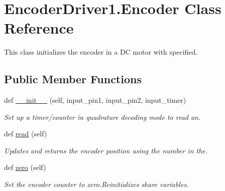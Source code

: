\hypertarget{classEncoderDriver1_1_1Encoder}{}\section{Encoder\+Driver1.\+Encoder Class Reference}
\label{classEncoderDriver1_1_1Encoder}


This class initializes the encoder in a DC motor with specified.  


\subsection*{Public Member Functions}
\begin{DoxyCompactItemize}
\item 
def \mbox{\hyperlink{classEncoderDriver1_1_1Encoder_aa7177f4e682b9507dfb0db1602137c7c}{\+\_\+\+\_\+init\+\_\+\+\_\+}} (self, input\+\_\+pin1, input\+\_\+pin2, input\+\_\+timer)
\begin{DoxyCompactList}\small\item\em Set up a timer/counter in quadrature decoding mode to read an. \end{DoxyCompactList}\item 
def \mbox{\hyperlink{classEncoderDriver1_1_1Encoder_a40717d85819b23fba3c758c1c3a6ae9d}{read}} (self)
\begin{DoxyCompactList}\small\item\em Updates and returns the encoder position using the number in the. \end{DoxyCompactList}\item 
def \mbox{\hyperlink{classEncoderDriver1_1_1Encoder_a9d715e18b6509019f5233b8f31af2c0c}{zero}} (self)
\begin{DoxyCompactList}\small\item\em Set the encoder counter to zero.\+Reinitializes share variables. \end{DoxyCompactList}\end{DoxyCompactItemize}

